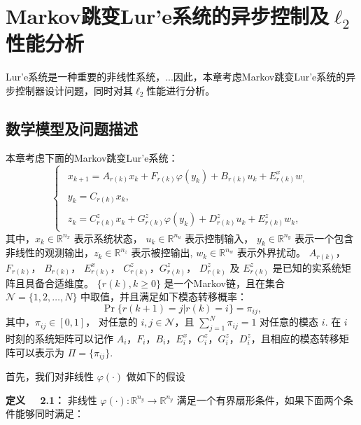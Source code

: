 
\chapter{Markov跳变Lur'e系统的异步控制及$\ell_2$性能分析}
Lur'e系统是一种重要的非线性系统，...因此，本章考虑Markov跳变Lur'e系统的异步控制器设计问题，同时对其$\ell_2$性能进行分析。

\section{数学模型及问题描述}
	本章考虑下面的Markov跳变Lur'e系统：
	\begin{equation}\label{syseq}\left\{
	\begin{array}{lr}
		\begin{split}
			x_{k+1}=A_{r(k)}x_k+F_{r(k)}\varphi(y_k)+B_{r(k)}u_k +E^x_{r(k)}w_,
		\end{split}\\
		\begin{split}
			y_k=C_{r(k)}x_k,
		\end{split}
		\\
		\begin{split}
			z_k= C^z_{r(k)}x_k+G^z_{r(k)}\varphi(y_k)+D^z_{r(k)}u_k+E^z_{r(k)}w_k,
		\end{split}	
	\end{array}\right.
	\end{equation}
	其中，$x_k\in\mathbb{R}^{n_x}$ 表示系统状态， $u_k\in\mathbb{R}^{n_u}$ 表示控制输入， $y_k\in\mathbb{R}^{n_y}$ 表示一个包含非线性的观测输出，$ z_k\in\mathbb{R}^{n_z}$ 表示被控输出, $w_k\in\mathbb{R}^{n_w}$ 表示外界扰动。 $A_{r(k)}$， $F_{r(k)}$， $B_{r(k)}$， $E^x_{r(k)}$， $C^z_{r(k)}$，$G^z_{r(k)}$， $D^z_{r(k)}$ 及 $E^z_{r(k)}$ 是已知的实系统矩阵且具备合适维度。
	$\{r(k),k\geq0\}$ 是一个Markov链，且在集合 $\mathcal{N}=\{1,2,\dots,N\}$ 中取值，并且满足如下模态转移概率：
	\begin{equation}
	\Pr\{r(k+1)=j|r(k)=i\}=\pi_{ij},
	\end{equation}
	其中，$\pi_{ij}\in[0,1]$， 对任意的 $i,j\in\mathcal{N}$，且 $\sum_{j=1}^{N}\pi_{ij}=1$ 对任意的模态 $i$. 在 $i$ 时刻的系统矩阵可以记作 $A_i$，$F_i$，$B_i$，$E^x_i$，$C^z_i$，$G^z_i$，$D^z_i$，且相应的模态转移矩阵可以表示为 $\varPi=\{\pi_{ij}\}$.
	
	首先，我们对非线性 $\varphi(\cdot)$ 做如下的假设
	
	{\bf 定义 \ \ 2.1：} 
	非线性 $\varphi(\cdot): \mathbb{R}^{n_y}\rightarrow\mathbb{R}^{n_y}$ 满足一个有界扇形条件，如果下面两个条件能够同时满足：
		
